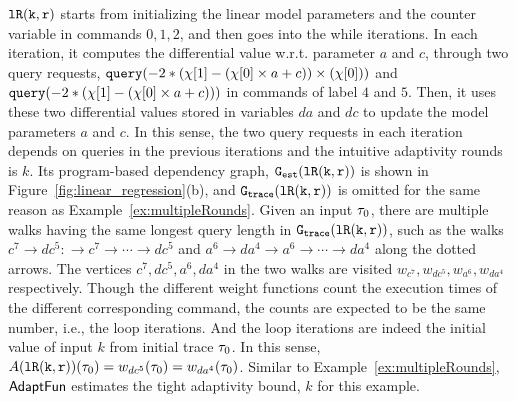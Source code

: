 $\mathtt{lR(k, r)}$ starts from initializing the linear model parameters and the counter variable in commands $0, 1, 2$,
and then goes into the while iterations.
In each iteration, it computes the differential value w.r.t. parameter
$a$ and $c$,
through two query requests, 
${\tt query}(-2 * (\chi[1] - (\chi[0]\times a + c)) \times (\chi[0]))$ and 
${\tt query}(-2 * (\chi[1] - (\chi[0]\times a + c)))$
in commands of label $4$ and $5$.
Then, it uses these two differential values stored in variables $da$ and $dc$
to update the model parameters $a$ and $c$.
In this sense, the two query requests in each iteration depends on queries in the previous iterations and the intuitive adaptivity rounds is $k$.
%
Its program-based dependency graph, $\mathtt{{G_{est}}}(\mathtt{lR(k, r)})$ is shown in Figure~\ref{fig:linear_regression}(b),
and $\mathtt{{G_{trace}}}(\mathtt{lR(k, r)})$ is omitted for the same reason as Example~\ref{ex:multipleRounds}.
Given an input $\mathtt{\tau}_0$, there are multiple walks having the same longest query length in 
$\mathtt{{G_{trace}}}(\mathtt{lR(k, r)})$,
such as the walks 
$c^7 \to dc^5 : \to c^7 \to \cdots \to dc^5$ and
$a^6 \to da^4  \to a^6 \to \cdots \to da^4 $ along the 
dotted arrows.
The vertices $c^7, dc^5, a^6, da^4$ in the two walks are visited $w_{c^7}, w_{dc^5}, w_{a^6}, w_{da^4}$ respectively.
Though the different weight functions count the execution times of the different corresponding command,
the counts are expected to be the same number, i.e., the loop iterations.
And the loop iterations are indeed the initial value of input $k$ from initial trace $\mathtt{\tau}_0$.
In this sense, $A(\mathtt{lR(k, r)})(\mathtt{\tau}_0) = w_{dc^5}(\mathtt{\tau}_0) = w_{da^4}(\mathtt{\tau}_0)$.
Similar to Example~\ref{ex:multipleRounds}, $\textsf{AdaptFun}$ estimates the tight adaptivity bound, $k$ for this example.

%